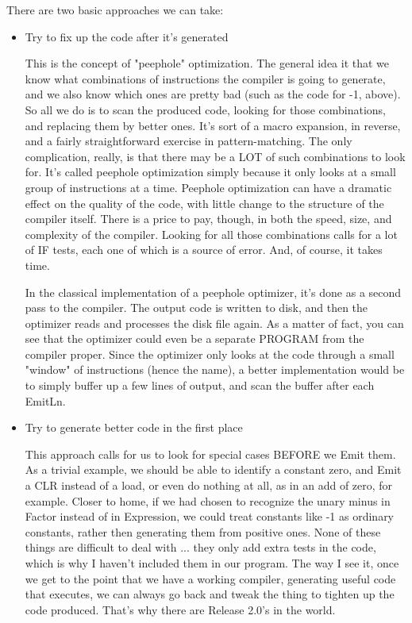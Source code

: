 \documentclass[float=false, crop=false]{standalone}
\begin{document}
There are two basic approaches we can take:
\begin{itemize}
\item Try to fix up the code after it's generated

    This is the concept of "peephole" optimization. The general idea it that we
    know what combinations of instructions the compiler is going to generate,
    and we also know which ones are pretty bad (such as the code for -1, above).
    So all we do is to scan the produced code, looking for those combinations,
    and replacing them by better ones. It's sort of a macro expansion, in
    reverse, and a fairly straightforward exercise in pattern-matching. The only
    complication, really, is that there may be a LOT of such combinations to
    look for. It's called peephole optimization simply because it only looks at
    a small group of instructions at a time. Peephole optimization can have a
    dramatic effect on the quality of the code, with little change to the
    structure of the compiler itself. There is a price to pay, though, in both
    the speed, size, and complexity of the compiler. Looking for all those
    combinations calls for a lot of IF tests, each one of which is a source of
    error. And, of course, it takes time.

     In the classical implementation of a peephole optimizer, it's done as a
    second pass to the compiler. The output code is written to disk, and then
    the optimizer reads and processes the disk file again. As a matter of fact,
    you can see that the optimizer could even be a separate PROGRAM from the
    compiler proper. Since the optimizer only looks at the code through a small
    "window" of instructions (hence the name), a better implementation would be
    to simply buffer up a few lines of output, and scan the buffer after each
    EmitLn.

\item Try to generate better code in the first place

    This approach calls for us to look for special cases BEFORE we Emit them. As
    a trivial example, we should be able to identify a constant zero, and Emit a
    CLR instead of a load, or even do nothing at all, as in an add of zero, for
    example. Closer to home, if we had chosen to recognize the unary minus in
    Factor instead of in Expression, we could treat constants like -1 as
    ordinary constants, rather then generating them from positive ones. None of
    these things are difficult to deal with ... they only add extra tests in the
    code, which is why I haven't included them in our program. The way I see it,
    once we get to the point that we have a working compiler, generating useful
    code that executes, we can always go back and tweak the thing to tighten up
    the code produced. That's why there are Release 2.0's in the world.
\end{itemize}
\end{document}
